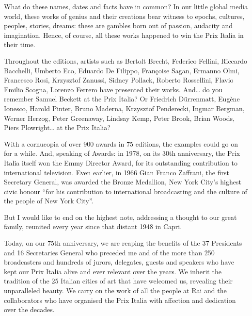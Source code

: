 {{What do these names, dates and facts have in common? In our little global media world, these works of genius and their creations bear witness to epochs, cultures, peoples, stories, dreams: these are gambles born out of passion, audacity and imagination. Hence, of course, all these works happened to win the Prix Italia in their time.

Throughout the editions, artists such as Bertolt Brecht, Federico Fellini, Riccardo Bacchelli, Umberto Eco, Eduardo De Filippo, Françoise Sagan, Ermanno Olmi, Francesco Rosi, Krzysztof Zanussi, Sidney Pollack, Roberto Rossellini, Flavio Emilio Scogna, Lorenzo Ferrero have presented their works. And\dots{} do you remember Samuel Beckett at the Prix Italia? Or Friedrich Dürrenmatt, Eugène Ionesco, Harold Pinter, Bruno Maderna, Krzysztof Penderecki, Ingmar Bergman, Werner Herzog, Peter Greenaway, Lindsay Kemp, Peter Brook, Brian Woods, Piers Plowright\dots{} at the Prix Italia?

With a cornucopia of over 900 awards in 75 editions, the examples could go on for a while. And, speaking of Awards: in 1978, on its 30th anniversary, the Prix Italia itself won the Emmy Director Award, for its outstanding contribution to international television. Even earlier, in 1966 Gian Franco Zaffrani, the first Secretary General, was awarded the Bronze Medallion, New York City's highest civic honour ``for his contribution to international broadcasting and the culture of the people of New York City''. 

But I would like to end on the highest note, addressing a thought to our great family, reunited every year since that distant 1948 in Capri. 

Today, on our 75th anniversary, we are reaping the benefits of the 37 Presidents and 16 Secretaries General who preceded me and of the more than 250 broadcasters and hundreds of jurors, delegates, guests and speakers who have kept our Prix Italia alive and ever relevant over the years. We inherit the tradition of the 25 Italian cities of art that have welcomed us, revealing their unparalleled beauty. We carry on the work of all the people at Rai and the collaborators who have organised the Prix Italia with affection and dedication over the decades. 

}}
